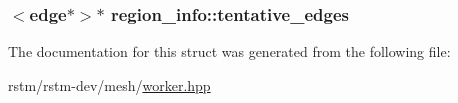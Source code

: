 \hypertarget{structregion__info_a9d8a6202258ed7ad229e753a2bd52c6f}{
\subsubsection[{tentative\-\_\-edges}]{$<${\bf edge}$\ast$$>$$\ast$ region\-\_\-info\-::tentative\-\_\-edges}}\label{structregion__info_a9d8a6202258ed7ad229e753a2bd52c6f}


The documentation for this struct was generated from the following file\-:\begin{DoxyCompactItemize}
\item 
rstm/rstm-\/dev/mesh/\hyperlink{worker_8hpp}{worker.\-hpp}\end{DoxyCompactItemize}
